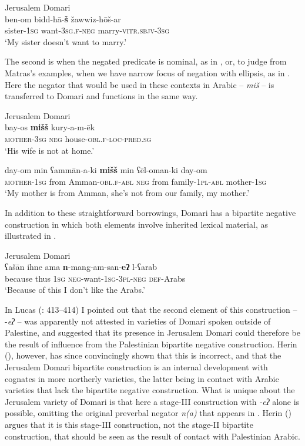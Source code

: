 \documentclass[output=paper]{langsci/langscibook}
\begin{document}
\ea\label{domneg}
{       Jerusalem Domari \citep[351]{Matras2012}}\\
\gll ben-om bidd-hā-\textbf{š} žawwiz-hōš-ar\\
     sister-\textsc{1sg} want\textsc{{}-3sg.f-neg} marry\textsc{-vitr.sbjv-3sg}\\
\glt ‘My sister doesn’t want to marry.’
\z

The second is when the negated predicate is nominal, as in , or, to judge from Matras’s examples, when we have narrow focus of negation with ellipsis, as in . Here the negator that would be used in these contexts in Arabic – \textit{miš} – is transferred to Domari and functions in the same way.

\ea
{Jerusalem Domari \citep[350]{Matras2012}}\\
\ea\gll bay-os \textbf{mišš} kury-a-m-ēk\label{jer.a}\\
     \textsc{\textup{mother-}}\textsc{3sg} \textsc{neg} house\textsc{-obl.f-loc-pred.sg}  \\
\glt ‘His wife is not at home.’

\ex\gll day-om min ʕammān-a-ki \textbf{mišš} min ʕēl-oman-ki day-om\label{jer.b}\\
     \textsc{\textup{mother-1}}\textsc{sg} from Amman-\textsc{obl.f-abl} \textsc{neg} from family-\textsc{1pl-abl} mother\textsc{-1sg}\\
\glt ‘My mother is from Amman, she’s not from our family, my mother.’
\z
\z

In addition to these straightforward borrowings, Domari has a bipartite negative construction in which both elements involve inherited lexical material, as illustrated in .

\ea\label{jer.c}
{       Jerusalem Domari \citep[117]{Matras2012}}\\
\gll ʕašān ihne ama \textbf{n}-mang-am-san-\textbf{eʔ} l-ʕarab\\
     because thus \textsc{1sg} \textsc{neg-}want-\textsc{1sg-3pl-neg} \textsc{def-}Arabs\\
\glt ‘Because of this I don’t like the Arabs.’
\z

In Lucas (\citeyear{Lucas2013}: 413–414) I pointed out that the second element of this construction – -\textit{eʔ} – was apparently not attested in varieties of Domari spoken outside of Palestine, and suggested that its presence in Jerusalem Domari could therefore be the result of influence from the Palestinian bipartite negative construction. Herin (\citeyear{Herin2016,Herin2018}), however, has since convincingly shown that this is incorrect, and that the Jerusalem Domari bipartite construction is an internal development with cognates in more northerly varieties, the latter being in contact with Arabic varieties that lack the bipartite negative construction. What is unique about the Jerusalem variety of Domari is that here a stage-III construction with \textit{{}-eʔ} alone is possible, omitting the original preverbal negator \textit{n(a)} that appears in . Herin (\citeyear[32]{Herin2018}) argues that it is this stage-III construction, not the stage-II bipartite construction, that should be seen as the result of contact with Palestinian Arabic. 
\end{document}
